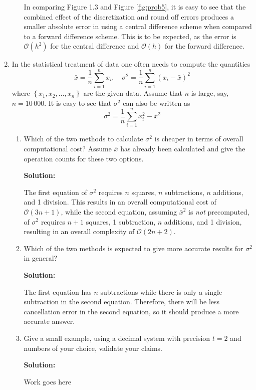 \documentclass[12pt]{article}
\begin{document}
\begin{enumerate}
\begin{enumerate}
In comparing Figure 1.3 and Figure \ref{fig:prob5}, it is easy to see that the
combined effect of the discretization and round off errors produces a smaller
absolute error in using a central difference scheme when compared to a forward
difference scheme. This is to be expected, as the error is $\mathcal{O}\left(h^{2}\right)$
for the central difference and $\mathcal{O}(h)$ for the forward difference.
\end{enumerate}

\item In the statistical treatment of data one often needs to compute the quantities
\[
\bar{x} = \frac{1}{n}\sum_{i=1}^{n}x_{i},\quad \sigma^{2}=\frac{1}{n}\sum_{i=1}^{n}\left(x_{i}-\bar{x}\right)^{2}
\]
where $\left\{ x_{1}, x_{2}, \ldots, x_{n}\right\}$ are the given data. Assume that $n$
is large, say, $n = 10\,000$. It is easy to see that $\sigma^{2}$ can also be written as
\[
\sigma^{2} = \frac{1}{n}\sum_{i=1}^{n} x_{i}^{2} - \bar{x}^{2}
\]
\begin{enumerate}
\item Which of the two methods to calculate $\sigma^{2}$ is cheaper in terms of
overall computational cost? Assume $\bar{x}$ has already been calculated and give
the operation counts for these two options.

{\bf Solution:}

The first equation of $\sigma^{2}$ requires $n$ squares, $n$ subtractions, $n$ additions, and 1 division.
This results in an overall computational cost of $\mathcal{O}(3n+1)$, while the second
equation, assuming $\bar{x}^{2}$ is {\em not} precomputed,
of $\sigma^{2}$ requires $n+1$ squares, 1 subtraction, $n$ additions, and 1 division,
resulting in an overall complexity of $\mathcal{O}(2n+2)$.

\item Which of the two methods is expected to give more accurate results for
$\sigma^{2}$ in general?

{\bf Solution:}

The first equation has $n$ subtractions while there is only a single subtraction
in the second equation. Therefore, there will be less cancellation error in the
second equation, so it should produce a more accurate answer.

\item Give a small example, using a decimal system with precision $t = 2$ and
numbers of your choice, validate your claims.

{\bf Solution:}

Work goes here
\end{enumerate}
\end{enumerate}
\end{document}

